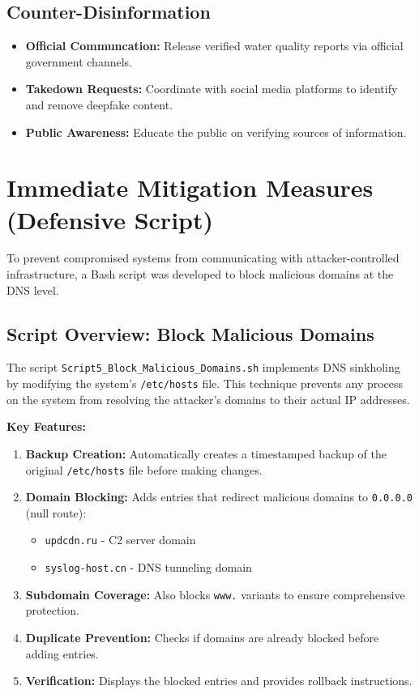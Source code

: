 \documentclass[12pt,a4paper]{article}
\begin{document}
\subsection{Counter-Disinformation}
\begin{itemize}
    \item \textbf{Official Communcation:} Release verified water quality reports via official government channels.
    \item \textbf{Takedown Requests:} Coordinate with social media platforms to identify and remove deepfake content.
    \item \textbf{Public Awareness:} Educate the public on verifying sources of information.
\end{itemize}

\section{Immediate Mitigation Measures (Defensive Script)}
To prevent compromised systems from communicating with attacker-controlled infrastructure, a Bash script was developed to block malicious domains at the DNS level.

\subsection{Script Overview: Block Malicious Domains}
The script \texttt{Script5\_Block\_Malicious\_Domains.sh} implements DNS sinkholing by modifying the system's \texttt{/etc/hosts} file. This technique prevents any process on the system from resolving the attacker's domains to their actual IP addresses.

\textbf{Key Features:}
\begin{enumerate}
    \item \textbf{Backup Creation:} Automatically creates a timestamped backup of the original \texttt{/etc/hosts} file before making changes.
    \item \textbf{Domain Blocking:} Adds entries that redirect malicious domains to \texttt{0.0.0.0} (null route):
    \begin{itemize}
        \item \texttt{updcdn.ru} - C2 server domain
        \item \texttt{syslog-host.cn} - DNS tunneling domain
    \end{itemize}
    \item \textbf{Subdomain Coverage:} Also blocks \texttt{www.} variants to ensure comprehensive protection.
    \item \textbf{Duplicate Prevention:} Checks if domains are already blocked before adding entries.
    \item \textbf{Verification:} Displays the blocked entries and provides rollback instructions.
\end{enumerate}
\end{document}
